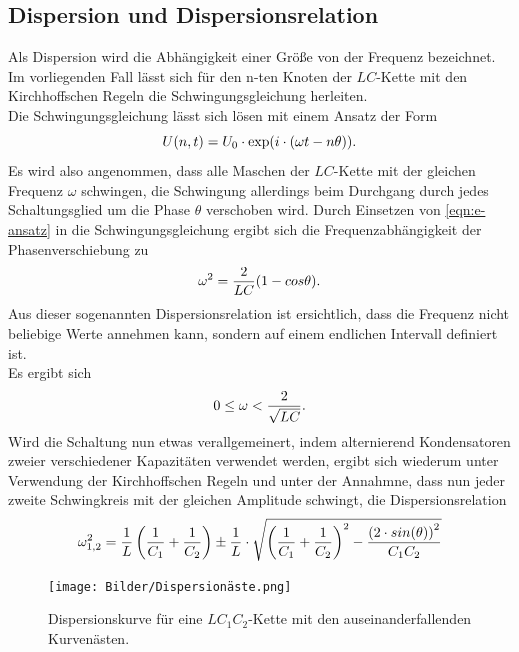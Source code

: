 \subsection{Dispersion und Dispersionsrelation}
\label{subsec-dispersion}
Als Dispersion wird die Abhängigkeit einer Größe von der Frequenz bezeichnet.
Im vorliegenden Fall lässt sich für den n-ten Knoten der $LC$-Kette mit den Kirchhoffschen Regeln die Schwingungsgleichung herleiten.\\
Die Schwingungsgleichung lässt sich lösen mit einem Ansatz der Form
\begin{equation}
	\centering
	U(n,t)=U_{\mathrm{0}} \cdot \mathrm{exp}(i\cdot( \omega t- n\theta )).
	\label{eqn:e-ansatz}
\end{equation}
Es wird also angenommen, dass alle Maschen der $LC$-Kette mit der gleichen Frequenz $\omega$ schwingen, die Schwingung allerdings beim Durchgang durch jedes Schaltungsglied um die Phase $\theta$ verschoben wird.
Durch Einsetzen von \eqref{eqn:e-ansatz} in die Schwingungsgleichung ergibt sich die Frequenzabhängigkeit der Phasenverschiebung zu
\begin{equation}
	\centering
	\omega^2=\frac{2}{LC}(1-cos{\theta}).
	\label{eqn:dispersion}
\end{equation}
Aus dieser sogenannten Dispersionsrelation ist ersichtlich, dass die Frequenz \omega nicht beliebige Werte annehmen kann,
sondern auf einem endlichen Intervall definiert ist.\\
Es ergibt sich
\begin{equation*}
	\centering
	0\leq \omega<\frac{2}{\sqrt{LC}}.
\end{equation*}
Wird die Schaltung nun etwas verallgemeinert, indem alternierend Kondensatoren zweier verschiedener Kapazitäten verwendet werden,
ergibt sich wiederum unter Verwendung der Kirchhoffschen Regeln und unter der Annahmne, dass nun jeder zweite Schwingkreis mit der gleichen Amplitude
schwingt, die Dispersionsrelation
\begin{equation}
	\centering
	\omega_{1,2}^2=\frac{1}{L}\left ( \frac{1}{C_{\mathrm{1}}}+\frac{1}{C_{\mathrm{2}}} \right ) \pm \frac{1}{L} \cdot \sqrt{\left ( \frac{1}{C_{\mathrm{1}}}+\frac{1}{C_{\mathrm{2}}} \right )^2-\frac{\left(2\cdot sin(\theta)\right)^2}{C_{\mathrm{1}}C_{\mathrm{2}}}}
	\label{eqn:dispersion2}
\end{equation}
\begin{figure}
	\centering
	\texttt{[image: Bilder/Dispersionäste.png]}
	\caption{Dispersionskurve für eine $LC_{\mathrm{1}}C_{\mathrm{2}}$-Kette mit den auseinanderfallenden Kurvenästen. \cite{Anleitung}}
	\label{fig:dispersionskurve}
\end{figure}
